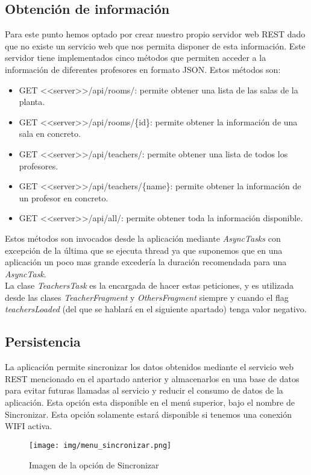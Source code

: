 \documentclass[12pt, a4paper, titlepage]{article}
\begin{document}
	\subsection{Obtención de información}
	Para este punto hemos optado por crear nuestro propio servidor web REST dado que no existe un servicio web que nos permita disponer de esta información. Este servidor tiene implementados cinco métodos que permiten acceder a la información de diferentes profesores en formato JSON. Estos métodos son: 
	\begin{itemize}
		\item GET <<server>>/api/rooms/: permite obtener una lista de las salas de la planta.
		\item GET <<server>>/api/rooms/\{id\}: permite obtener la información de una sala en concreto.
		\item GET <<server>>/api/teachers/: permite obtener una lista de todos los profesores.
		\item GET <<server>>/api/teachers/\{name\}:  permite obtener la información de un profesor en concreto.
		\item GET <<server>>/api/all/:  permite obtener toda la información disponible.
	\end{itemize}
	Estos métodos son invocados desde la aplicación mediante \textit{AsyncTasks} con excepción de la última que se ejecuta thread ya que suponemos que en una aplicación un poco mas grande excedería la duración recomendada para una \textit{AsyncTask}.\\
	La clase \textit{TeachersTask} es la encargada de hacer estas peticiones, y es utilizada desde las clases \textit{TeacherFragment} y \textit{OthersFragment} siempre y cuando el flag \textit{teachersLoaded} (del que se hablará en el siguiente apartado) tenga valor negativo.
	
	\subsection{Persistencia}
	La aplicación permite sincronizar los datos obtenidos mediante el servicio web REST mencionado en el apartado anterior y almacenarlos en una base de datos para evitar futuras llamadas al servicio y reducir el consumo de datos de la aplicación.
	Esta opción esta disponible en el menú superior, bajo el nombre de Sincronizar. Esta opción solamente estará disponible si tenemos una conexión WIFI activa.\\
	
	\begin{figure}[h!]
		\begin{center}
			\texttt{[image: img/menu\_sincronizar.png]}
			\caption{Imagen de la opción de Sincronizar}
		\end{center}
	\end{figure}
	
\end{document}
